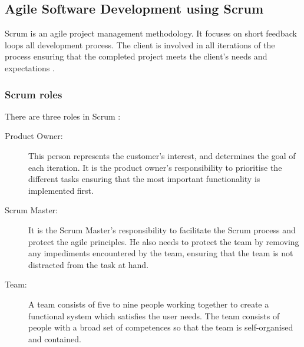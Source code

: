 \subsection{Agile Software Development using Scrum}
Scrum is an agile project management methodology. It focuses on short feedback
loops all development process. The client is involved in all iterations of the process
ensuring that the completed project meets the client's needs and expectations \parencite{ScrumGoesFormal}.

\subsubsection{Scrum roles}
There are three roles in Scrum \parencite{ScrumGoesFormal}:
\begin{description}
	\item [Product Owner:] This person represents the customer’s interest, and 
		determines the goal of each iteration. It is the product owner's responsibility
		to prioritise the different tasks ensuring that the most important functionality
		is implemented first.
	\item [Scrum Master:] It is the Scrum Master's responsibility to facilitate the Scrum 
		process and protect the agile principles. He also needs to protect the team by
		removing any impediments encountered by the team, ensuring that the team is not
		distracted from the task at hand.
	\item [Team:] A team consists of five to nine people working together to create
		a functional system which satisfies the user needs. The team consists of people
		with a broad set of competences so that the team is self-organised and contained.
\end{description}

